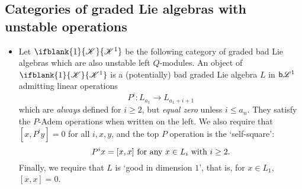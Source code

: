 \documentclass[10pt]{article}
\newcommand{\BadLie}[1]{\mathsf{b}{\scrL}^{#1}}%
\newcommand{\LL}[1]{\ifblank{#1}{\scrK}{\scrK^{#1}}}
\renewcommand{\Q}{Q}
\newcommand{\Comm}{\calC}
\newcommand{\CommSteen}{\calA(\Comm)}
\begin{document}
\begin{CategoriesOfInterest}
\subsection{Categories of graded Lie algebras with unstable operations}
\begin{itemize}
\setlength{\parindent}{.25in}
\item Let $\LL{1}$ be the following category of graded bad Lie algebras which are also unstable left $\Q$-modules.
An object of $\LL{1}$ is a (potentially) bad graded Lie algebra $L$ in $\BadLie{1}$ %
admitting linear operations
\[P^i:L_{a_1}\to L_{a_1+i+1}\]
which are \emph{always} defined for $i\geq2$, but \emph{equal zero} unless $i\leq a_n$. They satisfy the $P$-Adem operations when written on the left. We also require that $[x,P^iy]=0$ for all $i,x,y$, and the top $P$ operation is the `self-square':
\[P^{i}x=[x,x]\ \textup{for any $x\in L_{i}$ with $i\geq2$}.\]
Finally, we require that $L$ is `good in dimension $1$', that is, for $x\in L_1$, $[x,x]=0$.


\end{itemize}
\end{CategoriesOfInterest}
\end{document}
